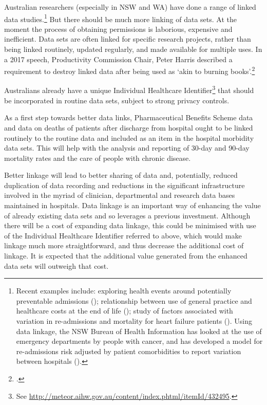 \documentclass[FrontPage]{grattan}
\begin{document}
Australian researchers (especially in NSW and WA) have done a range of linked data studies.\footnote{Recent examples include: exploring health events around potentially preventable admissions (\textcite{RN80}); relationship between use of general practice and healthcare costs at the end of life (\textcite{RN81}); study of factors associated with variation in re-admissions and mortality for heart failure patients (\textcite{RN82}). Using data linkage, the NSW Bureau of Health Information has looked at the use of emergency departments by people with cancer, and has developed a model for re-admissions risk adjusted by patient comorbidities to report variation between hospitals (\textcite{RN77}).}
But there should be much more linking of data sets. At the moment the process of obtaining permissions is laborious, expensive and inefficient. Data sets are often linked for specific research projects, rather than being linked routinely, updated regularly, and made available for multiple uses. In a 2017 speech, Productivity Commission Chair, Peter Harris described a requirement to destroy linked data after being used as `akin to burning books'.\footcite{harris2017data}

Australians already have a unique Individual Healthcare Identifier\footnote{See \textcolor{blue}{\url{  http://meteor.aihw.gov.au/content/index.phtml/itemId/432495}}.} that should be incorporated in routine data sets, subject to strong privacy controls.

As a first step towards better data links, Pharmaceutical Benefits Scheme data and data on deaths of patients after discharge from hospital ought to be linked routinely to the routine data and included as an item in the hospital morbidity data sets. This will help with the analysis and reporting of 30-day and 90-day mortality rates and the care of people with chronic disease.

Better linkage will lead to better sharing of data and, potentially, reduced duplication of data recording and reductions in the significant infrastructure involved in the myriad of clinician, departmental and research data bases maintained in hospitals. Data linkage is an important way of enhancing the value of already existing data sets and so leverages a previous investment. Although there will be a cost of expanding data linkage, this could be minimised with use of the Individual Healthcare Identifier referred to above, which would make linkage much more straightforward, and thus decrease the additional cost of linkage. It is expected that the additional value generated from the enhanced data sets will outweigh that cost.
\end{document}
